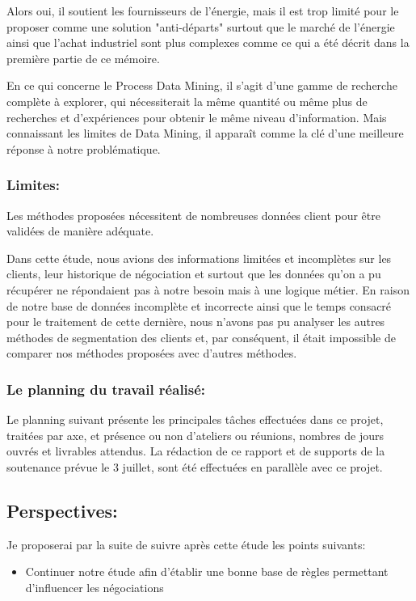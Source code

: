 \documentclass[12pt]{article}
\begin{document}
{Alors oui, il soutient les fournisseurs de l'énergie, mais il est trop limité pour le proposer comme une solution "anti-départs" surtout que le marché de l'énergie ainsi que l’achat industriel sont plus complexes comme ce qui a été décrit dans la première partie de ce mémoire.

En ce qui concerne le Process Data Mining, il s'agit d'une gamme de recherche complète à explorer, qui nécessiterait la même quantité ou même plus de recherches et d'expériences pour obtenir le même niveau d'information. Mais connaissant les limites de Data Mining, il apparaît comme la clé d'une meilleure réponse à notre problématique.


\subsubsection{Limites:}
Les méthodes proposées nécessitent de nombreuses données client pour être validées de manière adéquate.

Dans cette étude, nous avions des informations limitées et incomplètes sur les clients, leur historique de négociation et surtout que les données qu’on a pu récupérer ne répondaient pas à notre besoin mais à une logique métier.
En raison de notre base de données incomplète et incorrecte ainsi que le temps consacré pour le traitement de cette dernière, nous n'avons pas pu analyser les autres méthodes de segmentation des clients et, par conséquent, il était impossible de comparer nos méthodes proposées avec d'autres méthodes.

\subsubsection{Le planning du travail réalisé:}
Le planning suivant présente les principales tâches effectuées dans ce projet, traitées par axe, et présence ou non d’ateliers ou réunions, nombres de jours ouvrés et livrables attendus. La rédaction de ce rapport et de supports de la soutenance prévue le 3 juillet, sont été effectuées en parallèle avec ce projet.


\subsection{Perspectives:}
Je proposerai par la suite de suivre après cette étude les points suivants:

\begin{itemize}
\item Continuer notre étude afin d'établir une bonne base de règles permettant d'influencer les négociations


\end{itemize}}
\end{document}
